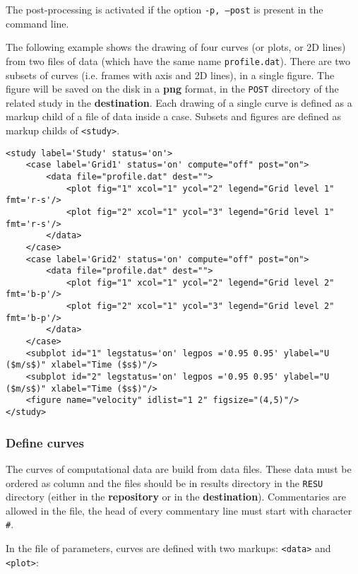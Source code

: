 \documentclass[a4paper,10pt,twoside]{article}
\begin{document}
The post-processing is activated if the option \texttt{-p, --post} is present
in the command line.

The following example shows the drawing of four curves (or plots, or 2D lines)
from two files of data (which have the same name \texttt{profile.dat}). There
are two subsets of curves (i.e. frames with axis and 2D lines), in a single
figure. The figure will be saved on the disk in a \textbf{png} format, in the
\texttt{POST} directory of the related study in the \textbf{destination}. Each
drawing of a single curve is defined as a markup child of a file of data inside
a case. Subsets and figures are defined as markup childs of \texttt{<study>}.

\small
\begin{verbatim}
<study label='Study' status='on'>
    <case label='Grid1' status='on' compute="off" post="on">
        <data file="profile.dat" dest="">
            <plot fig="1" xcol="1" ycol="2" legend="Grid level 1" fmt='r-s'/>
            <plot fig="2" xcol="1" ycol="3" legend="Grid level 1" fmt='r-s'/>
        </data>
    </case>
    <case label='Grid2' status='on' compute="off" post="on">
        <data file="profile.dat" dest="">
            <plot fig="1" xcol="1" ycol="2" legend="Grid level 2" fmt='b-p'/>
            <plot fig="2" xcol="1" ycol="3" legend="Grid level 2" fmt='b-p'/>
        </data>
    </case>
    <subplot id="1" legstatus='on' legpos ='0.95 0.95' ylabel="U ($m/s$)" xlabel="Time ($s$)"/>
    <subplot id="2" legstatus='on' legpos ='0.95 0.95' ylabel="U ($m/s$)" xlabel="Time ($s$)"/>
    <figure name="velocity" idlist="1 2" figsize="(4,5)"/>
</study>
\end{verbatim}
\normalsize

\subsubsection{Define curves}

The curves of computational data are build from data files. These data must be
ordered as column and the files should be in results directory in the
\texttt{RESU} directory (either in the \textbf{repository} or in the
\textbf{destination}). Commentaries are allowed in the file, the head of every
commentary line must start with character \texttt{\#}.

In the file of parameters, curves are defined with two markups:
\texttt{<data>} and \texttt{<plot>}:
\end{document}
